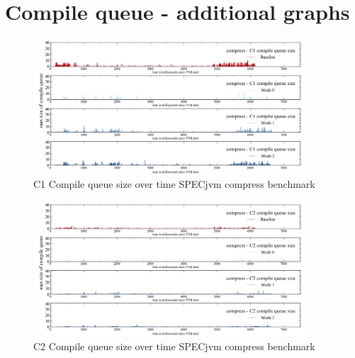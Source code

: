\section{Compile queue - additional graphs}
\label{a:additional_graphs}
\begin{figure}[ht]
  \begin{center}
    \centering
    \includegraphics[width=0.90\textwidth]{figures/spec_queue_compress_separate_c1.png}
    \caption{C1 Compile queue size over time SPECjvm compress benchmark}
    \label{f:spec_queue_compress_separate_c1}
  \end{center}
\end{figure}
\begin{figure}[ht]
  \begin{center}
    \centering
    \includegraphics[width=0.90\textwidth]{figures/spec_queue_compress_separate_c2.png}
    \caption{C2 Compile queue size over time SPECjvm compress benchmark}
    \label{f:spec_queue_compress_separate_c2}
  \end{center}
\end{figure}
